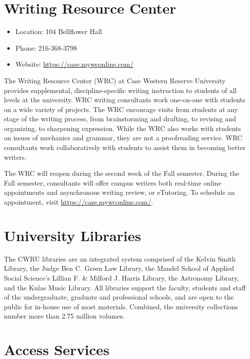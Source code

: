 \documentclass[
]{book}
\providecommand{\tightlist}{%
  \setlength{\itemsep}{0pt}\setlength{\parskip}{0pt}}
\begin{document}
\hypertarget{writing-resource-center}{%
\section{Writing Resource Center}\label{writing-resource-center}}

\begin{itemize}
\tightlist
\item
  Location: 104 Bellflower Hall
\item
  Phone: 216-368-3798
\item
  Website: \url{https://case.mywconline.com/}
\end{itemize}

The Writing Resource Center (WRC) at Case Western Reserve University provides supplemental, discipline-specific writing instruction to students of all levels at the university. WRC writing consultants work one-on-one with students on a wide variety of projects. The WRC encourage visits from students at any stage of the writing process, from brainstorming and drafting, to revising and organizing, to sharpening expression. While the WRC also works with students on issues of mechanics and grammar, they are not a proofreading service. WRC consultants work collaboratively with students to assist them in becoming better writers.

The WRC will reopen during the second week of the Fall semester. During the Fall semester, consultants will offer campus writers both real-time online appointments and asynchronous writing review, or eTutoring. To schedule an appointment, visit \url{https://case.mywconline.com/}.

\hypertarget{university-libraries}{%
\section{University Libraries}\label{university-libraries}}

The CWRU libraries are an integrated system comprised of the Kelvin Smith Library, the Judge Ben C. Green Law Library, the Mandel School of Applied Social Science's Lillian F. \& Milford J. Harris Library, the Astronomy Library, and the Kulas Music Library. All libraries support the faculty, students and staff of the undergraduate, graduate and professional schools, and are open to the public for in-house use of most materials. Combined, the university collections number more than 2.75 million volumes.

\hypertarget{access-services}{%
\section{Access Services}\label{access-services}}
\end{document}
